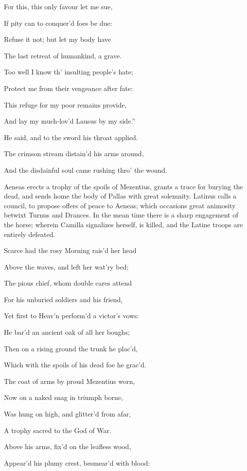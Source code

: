 For this, this only favour let me sue,

If pity can to conquer’d foes be due:

Refuse it not; but let my body have

The last retreat of humankind, a grave.

Too well I know th’ insulting people’s hate;

Protect me from their vengeance after fate:

This refuge for my poor remains provide,

And lay my much-lov’d Lausus by my side.”

He said, and to the sword his throat applied.

The crimson stream distain’d his arms around,

And the disdainful soul came rushing thro’ the wound.


Aeneas erects a trophy of the spoils of Mezentius, grants a truce for
burying the dead, and sends home the body of Pallas with great solemnity.
Latinus calls a council, to propose offers of peace to Aeneas; which
occasions great animosity betwixt Turnus and Drances. In the mean time
there is a sharp engagement of the horse; wherein Camilla signalizes
herself, is killed, and the Latine troops are entirely defeated.

Scarce had the rosy Morning rais’d her head

Above the waves, and left her wat’ry bed;

The pious chief, whom double cares attend

For his unburied soldiers and his friend,

Yet first to Heav’n perform’d a victor’s vows:

He bar’d an ancient oak of all her boughs;

Then on a rising ground the trunk he plac’d,

Which with the spoils of his dead foe he grac’d.

The coat of arms by proud Mezentius worn,

Now on a naked snag in triumph borne,

Was hung on high, and glitter’d from afar,

A trophy sacred to the God of War.

Above his arms, fix’d on the leafless wood,

Appear’d his plumy crest, besmear’d with blood:

